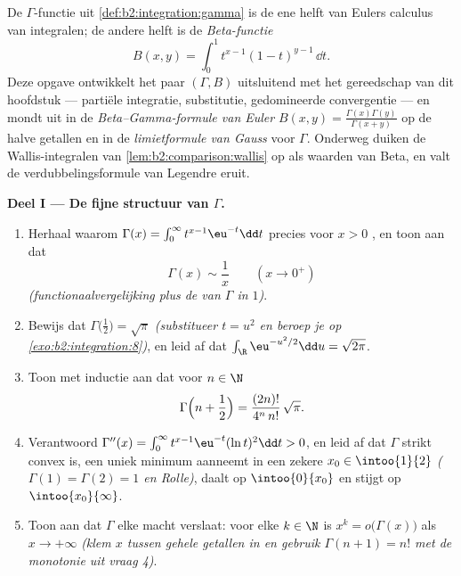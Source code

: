 \begin{problem}\label{pb:b2:integration:1}
De $\Gamma$-functie uit \cref{def:b2:integration:gamma} is de ene
helft van Eulers calculus van integralen; de andere helft is de
\emph{Beta-functie}
\[
B(x, y) = \int_0^1 t^{x-1}(1 - t)^{y-1}\,\dd t .
\]
Deze opgave ontwikkelt het paar $(\Gamma, B)$ uitsluitend met het
gereedschap van dit hoofdstuk --- partiële integratie, substitutie,
gedomineerde convergentie --- en mondt uit in de
\emph{Beta--Gamma-formule van Euler} $B(x,y) =
\frac{\Gamma(x)\Gamma(y)} {\Gamma(x+y)}$ op de halve getallen en in
de \emph{limietformule van Gauss}
voor $\Gamma$. Onderweg duiken de Wallis-integralen van
\cref{lem:b2:comparison:wallis} op als waarden van Beta, en valt de
verdubbelingsformule van Legendre eruit.

\medskip
\noindent\textbf{Deel I --- De fijne structuur van $\Gamma$.}
\begin{enumerate}
  \item Herhaal waarom $\Gamma(x) = \int_0^\infty
        t^{x-1}\eu^{-t}\dd t$ precies voor $x > 0$ , en
        toon aan dat
        \[
        \Gamma(x) \sim \frac1x \qquad (x \to 0^+)
        \]
        \emph{(functionaalvergelijking plus de  van
        $\Gamma$ in $1$)}.
  \item Bewijs dat $\Gamma\bigl(\tfrac12\bigr) = \sqrt\pi$
        \emph{(substitueer $t = u^2$ en beroep je op
        \cref{exo:b2:integration:8})}, en leid af dat $\int_\R
        \eu^{-u^2/2}\dd u = \sqrt{2\pi}$.
  \item Toon met inductie aan dat voor $n \in \N$
        \[
        \Gamma\Bigl(n + \frac12\Bigr)
        = \frac{(2n)!}{4^n\,n!}\,\sqrt\pi .
        \]
  \item Verantwoord $\Gamma''(x) = \int_0^\infty
        t^{x-1}\eu^{-t}(\ln t)^2\dd t > 0$, en leid af dat
        $\Gamma$ strikt convex is, een uniek minimum aanneemt in
        een zekere $x_0 \in \intoo{1}{2}$ \emph{($\Gamma(1) =
        \Gamma(2) = 1$ en Rolle)}, daalt op $\intoo{0}{x_0}$ en
        stijgt op $\intoo{x_0}{\infty}$.
  \item Toon aan dat $\Gamma$ elke macht verslaat: voor elke $k \in
        \N$ is $x^k = o\bigl(\Gamma(x)\bigr)$ als $x \to +\infty$
        \emph{(klem $x$ tussen gehele getallen in en gebruik
        $\Gamma(n+1) = n!$ met de monotonie uit vraag 4)}.
\end{enumerate}


\end{problem}
